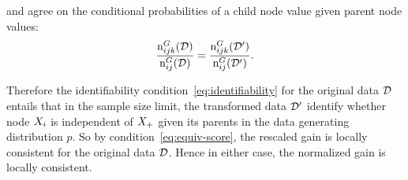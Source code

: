 \documentclass{article}
\begin{document}
and agree on the conditional probabilities of a child node value given parent node values:
\begin{equation}
\frac
{\mathrm{n}^{G}_{ijk}(\mathcal{D})}{\mathrm{n}^{G}_{ij}(\mathcal{D})} = \frac
{\mathrm{n}^{G}_{ijk}(\mathcal{D}')}{\mathrm{n}^{G}_{ij}(\mathcal{D}')}.
\end{equation}

Therefore the identifiability condition~\eqref{eq:identifiability} for the original data $\mathcal{D}$ entails that in the sample size limit, the transformed data $\mathcal{D}'$ identify whether node $X_{i}$ is independent of $X_{+}$ given its parents in the data generating distribution $p$. So by condition~\eqref{eq:equiv-score}, the rescaled gain is locally consistent for the original data $\mathcal{D}$. 
 Hence in either case, the normalized gain is locally consistent.



\end{document}
